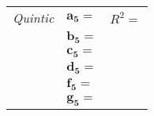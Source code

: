 \begin{center}
\begin{tabular}{r|l|c}
    {\itshape Quintic} 
        & $\bm{a_5} =$ \underline{\hspace{0.5in}} & $R^2 =$ \underline{\hspace{0.5in}} \\
        & $\bm{b_5} =$ \underline{\hspace{0.5in}} & \\
        & $\bm{c_5} =$ \underline{\hspace{0.5in}} & \\
        & $\bm{d_5} =$ \underline{\hspace{0.5in}} & \\
        & $\bm{f_5} =$ \underline{\hspace{0.5in}} & \\
        & $\bm{g_5} =$ \underline{\hspace{0.5in}} & \\
    \bottomrule
\end{tabular}
\end{center}